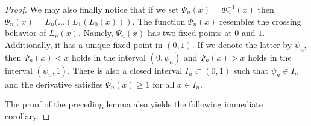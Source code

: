 \documentclass[10pt,a4paper]{amsart}
\begin{document}
\begin{proof}
We may also finally notice that if we set $\Psi _{n}(x)=\Phi _{n}^{-1}(x)$
then $\Psi _{n}(x)=L_{n}(...(L_{1}(L_{0}(x)))$. The function $\Psi _{n}(x)$
resembles the crossing behavior of $L_{n}(x)$. Namely, $\Psi _{n}(x)$ has
two fixed points at $0$ and $1$. Additionally, it has a unique fixed point
in $(0,1)$. If we denote the latter by $\psi _{n}$, then $\Psi _{n}(x)<x$
holds in the interval $(0,\psi _{n})$ and $\Psi _{n}(x)>x$ holds in the
interval $(\psi _{n},1)$. There is also a closed interval $I_{n}\subset
(0,1) $ such that $\psi _{n}\in I_{n}$ and the derivative satisfies $\Psi
_{n}^{^{\prime }}(x)\geq 1$ for all $x\in I_{n}$.

The proof of the preceding lemma also yields the following immediate
corollary.
\end{proof}
\end{document}
